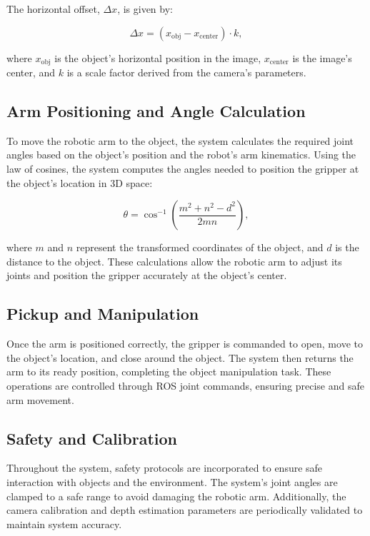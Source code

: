 The horizontal offset, $\Delta x$, is given by:

\begin{equation}
    \Delta x = (x_{\text{obj}} - x_{\text{center}}) \cdot k,
\end{equation}

where $x_{\text{obj}}$ is the object’s horizontal position in the image, $x_{\text{center}}$ is the image’s center, and $k$ is a scale factor derived from the camera’s parameters.

\subsection{Arm Positioning and Angle Calculation}
To move the robotic arm to the object, the system calculates the required joint angles based on the object’s position and the robot’s arm kinematics. Using the law of cosines, the system computes the angles needed to position the gripper at the object’s location in 3D space:

\begin{equation}
    \theta = \cos^{-1}\left( \frac{m^2 + n^2 - d^2}{2mn} \right),
\end{equation}

where $m$ and $n$ represent the transformed coordinates of the object, and $d$ is the distance to the object. These calculations allow the robotic arm to adjust its joints and position the gripper accurately at the object's center.

\subsection{Pickup and Manipulation}
Once the arm is positioned correctly, the gripper is commanded to open, move to the object’s location, and close around the object. The system then returns the arm to its ready position, completing the object manipulation task. These operations are controlled through ROS joint commands, ensuring precise and safe arm movement.

\subsection{Safety and Calibration}
Throughout the system, safety protocols are incorporated to ensure safe interaction with objects and the environment. The system’s joint angles are clamped to a safe range to avoid damaging the robotic arm. Additionally, the camera calibration and depth estimation parameters are periodically validated to maintain system accuracy.